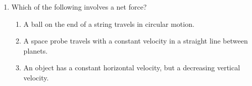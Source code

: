 \documentclass{../../oss-apphys}
\begin{document}
\begin{multicols}{2}
\begin{enumerate}[leftmargin=18pt]
%    
%    
%    
%

  \item Which of the following involves a net force?
    \begin{enumerate}[noitemsep,topsep=0pt,leftmargin=18pt,label=\Roman*.]
    \item A ball on the end of a string travels in circular motion.
    \item A space probe travels with a constant velocity in a straight line
      between planets.
    \item An object has a constant horizontal velocity, but a decreasing
      vertical velocity.
    \end{enumerate}
    

\end{enumerate}
\end{multicols}
\end{document}
